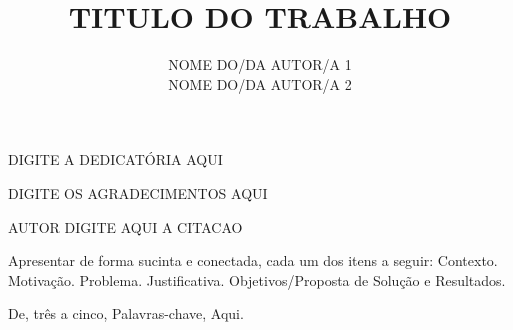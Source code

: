 \documentclass[tec, rde, classic, a4paper]{x_cuidado_com_esse_arquivo}
\author{NOME DO/DA AUTOR/A 1 \\ NOME DO/DA AUTOR/A 2 }
\title{TITULO DO TRABALHO}
\begin{document}
    \ifbacapa %
    
\clearpage

    \ifbacontracapa{} %




\clearpage

    \begin{dedicatory}
    DIGITE A DEDICATÓRIA AQUI
    \end{dedicatory}
    
    \acknowledgements
    DIGITE OS AGRADECIMENTOS AQUI
    

    \clearpage
    
    \begin{epigraph}[NOTA]{AUTOR}
    DIGITE AQUI A CITACAO
    \end{epigraph}

    \resumo %
    Apresentar de forma sucinta e conectada, cada um dos itens a seguir: Contexto. Motivação. Problema. Justificativa. Objetivos/Proposta de Solução e  Resultados.

    \begin{keywords} %
    De, três a cinco, Palavras-chave, Aqui.
    \end{keywords}



    \listoffigures %
    \listoftables %


\end{document}
